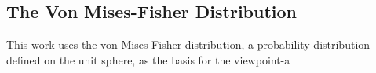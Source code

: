 \subsection{The Von Mises-Fisher Distribution}

This work uses the von Mises-Fisher distribution, a probability distribution defined on the unit sphere, as the basis for the viewpoint-a
